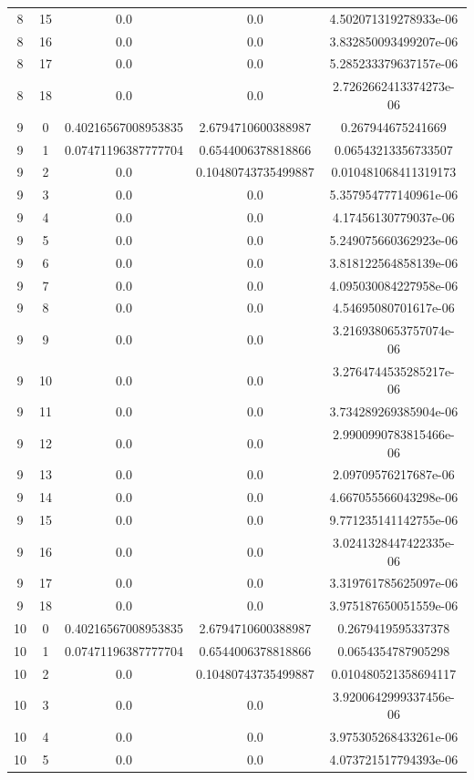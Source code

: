 \documentclass{article}
\begin{document}
\begin{table}[h]
\begin{tabular}{|c|c|c|c|c|}
8 & 15 & 0.0 & 0.0 & 4.502071319278933e-06 \\
8 & 16 & 0.0 & 0.0 & 3.832850093499207e-06 \\
8 & 17 & 0.0 & 0.0 & 5.285233379637157e-06 \\
8 & 18 & 0.0 & 0.0 & 2.7262662413374273e-06 \\
9 & 0 & 0.40216567008953835 & 2.6794710600388987 & 0.267944675241669 \\
9 & 1 & 0.07471196387777704 & 0.6544006378818866 & 0.06543213356733507 \\
9 & 2 & 0.0 & 0.10480743735499887 & 0.010481068411319173 \\
9 & 3 & 0.0 & 0.0 & 5.357954777140961e-06 \\
9 & 4 & 0.0 & 0.0 & 4.17456130779037e-06 \\
9 & 5 & 0.0 & 0.0 & 5.249075660362923e-06 \\
9 & 6 & 0.0 & 0.0 & 3.818122564858139e-06 \\
9 & 7 & 0.0 & 0.0 & 4.095030084227958e-06 \\
9 & 8 & 0.0 & 0.0 & 4.54695080701617e-06 \\
9 & 9 & 0.0 & 0.0 & 3.2169380653757074e-06 \\
9 & 10 & 0.0 & 0.0 & 3.2764744535285217e-06 \\
9 & 11 & 0.0 & 0.0 & 3.734289269385904e-06 \\
9 & 12 & 0.0 & 0.0 & 2.9900990783815466e-06 \\
9 & 13 & 0.0 & 0.0 & 2.09709576217687e-06 \\
9 & 14 & 0.0 & 0.0 & 4.667055566043298e-06 \\
9 & 15 & 0.0 & 0.0 & 9.771235141142755e-06 \\
9 & 16 & 0.0 & 0.0 & 3.0241328447422335e-06 \\
9 & 17 & 0.0 & 0.0 & 3.319761785625097e-06 \\
9 & 18 & 0.0 & 0.0 & 3.975187650051559e-06 \\
10 & 0 & 0.40216567008953835 & 2.6794710600388987 & 0.2679419595337378 \\
10 & 1 & 0.07471196387777704 & 0.6544006378818866 & 0.0654354787905298 \\
10 & 2 & 0.0 & 0.10480743735499887 & 0.010480521358694117 \\
10 & 3 & 0.0 & 0.0 & 3.9200642999337456e-06 \\
10 & 4 & 0.0 & 0.0 & 3.975305268433261e-06 \\
10 & 5 & 0.0 & 0.0 & 4.073721517794393e-06 \\

\end{tabular}
\end{table}
\end{document}
